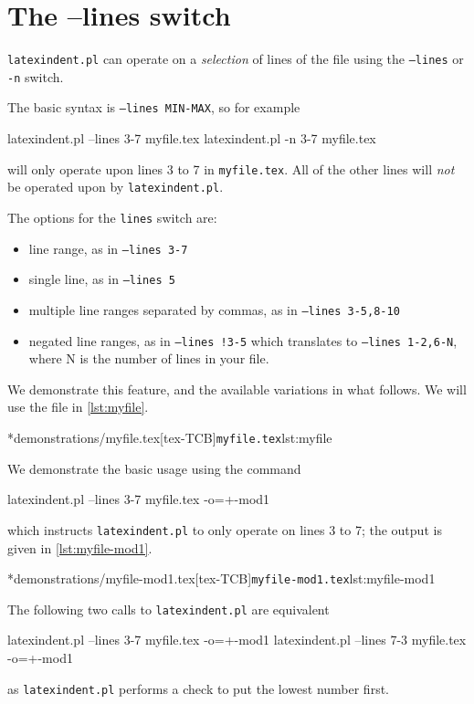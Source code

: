 \section{The --lines switch}\label{sec:line-switch}
 \texttt{latexindent.pl}
  can
 operate on a \emph{selection} of lines of the file using the \texttt{--lines} or
 \texttt{-n} switch.


 The basic syntax is \texttt{--lines MIN-MAX}, so for example
 \begin{commandshell}
latexindent.pl --lines 3-7 myfile.tex
latexindent.pl -n 3-7 myfile.tex
\end{commandshell}
 will only operate upon lines 3 to 7 in \texttt{myfile.tex}. All of the other lines will
 \emph{not} be operated upon by \texttt{latexindent.pl}.

 The options for the \texttt{lines} switch are:
 \begin{itemize}
	 \item line range, as in \texttt{--lines 3-7}
	 \item single line, as in \texttt{--lines 5}
	 \item multiple line ranges separated by commas, as in \texttt{--lines 3-5,8-10}
	 \item negated line ranges, as in \texttt{--lines !3-5} which translates to \texttt{--lines
		       1-2,6-N}, where N is the number of lines in your file.
 \end{itemize}

 We demonstrate this feature, and the available variations in what follows. We will use
 the file in \cref{lst:myfile}.

 \cmhlistingsfromfile[style=lineNumbersTeX]*{demonstrations/myfile.tex}[tex-TCB]{\texttt{myfile.tex}}{lst:myfile}

 \begin{example}
	 We demonstrate the basic usage using the command
	 \begin{commandshell}
latexindent.pl --lines 3-7 myfile.tex -o=+-mod1
\end{commandshell}
	 which instructs \texttt{latexindent.pl} to only operate on lines 3 to 7; the output is given in \cref{lst:myfile-mod1}.

	 \cmhlistingsfromfile[style=lineNumbersTeX]*{demonstrations/myfile-mod1.tex}[tex-TCB]{\texttt{myfile-mod1.tex}}{lst:myfile-mod1}

	 The following two calls to \texttt{latexindent.pl} are equivalent
	 \begin{commandshell}
latexindent.pl --lines 3-7 myfile.tex -o=+-mod1
latexindent.pl --lines 7-3 myfile.tex -o=+-mod1
\end{commandshell}
	 as \texttt{latexindent.pl} performs a check to put the lowest number first.
 \end{example}

